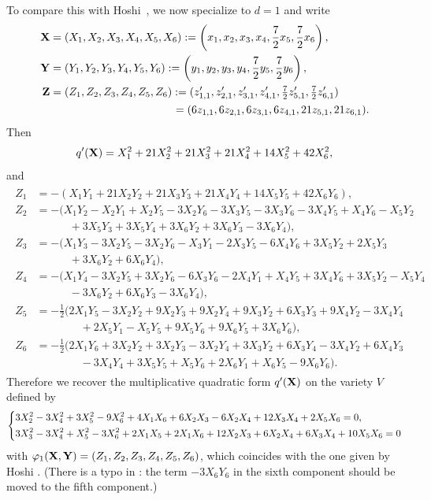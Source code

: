 \documentclass[a4paper, 11pt]{amsart}
\theoremstyle{plain}
\theoremstyle{definition}
\numberwithin{equation}{section}
\begin{document}
To compare this with Hoshi~\cite[Theorem 6]{Hos03}, we now specialize to $d=1$ and write
\begin{align*}
{\bf X}&=(X_1,X_2,X_3,X_4,X_5,X_6):=\left(x_1,x_2,x_3,x_4,\frac{7}{2}x_5,\frac{7}{2}x_6\right),\\
{\bf Y}&=(Y_1,Y_2,Y_3,Y_4,Y_5,Y_6):=\left(y_1,y_2,y_3,y_4,\frac{7}{2}y_5,\frac{7}{2}y_6\right),\\
{\bf Z}&=(Z_1,Z_2,Z_3,Z_4,Z_5,Z_6)
:=(z_{1,1}^{\prime},z_{2,1}^{\prime},z_{3,1}^{\prime},z_{4,1}^{\prime},\tfrac{7}{2}z_{5,1}^{\prime},\tfrac{7}{2}z_{6,1}^{\prime})\\
&\phantom{~=(Z_1,Z_2,Z_3,Z_4,Z_5,Z_6)}=(6z_{1,1},6z_{2,1},6z_{3,1},6z_{4,1},21z_{5,1},21z_{6,1}).
\end{align*}
Then
\[
q^\prime({\bf X})=X_1^2+21X_2^2+21X_3^2+21X_4^2+14X_5^2+42X_6^2,
\]
and
\begin{align*}
\begin{split}
Z_1
&=-(X_1Y_1+21X_2Y_2+21X_3Y_3+21X_4Y_4+14X_5Y_5+42X_6Y_6),\\
Z_2
&=-(X_1Y_2-X_2Y_1+X_2Y_5-3X_2Y_6-3X_3Y_5-3X_3Y_6-3X_4Y_5+X_4Y_6-X_5Y_2\\
&\qquad\quad +3X_5Y_3+3X_5Y_4+3X_6Y_2+3X_6Y_3-3X_6Y_4),\\
Z_3
&=-(X_1Y_3-3X_2Y_5-3X_2Y_6-X_3Y_1-2X_3Y_5-6X_4Y_6+3X_5Y_2+2X_5Y_3\\
&\qquad\quad +3X_6Y_2+6X_6Y_4),\\
Z_4
&=-(X_1Y_4-3X_2Y_5+3X_2Y_6-6X_3Y_6-2X_4Y_1+X_4Y_5+3X_4Y_6+3X_5Y_2-X_5Y_4\\
&\qquad\quad -3X_6Y_2+6X_6Y_3-3X_6Y_4),\\
Z_5
&=-\frac{1}{2}(2X_1Y_5-3X_2Y_2+9X_2Y_3+9X_2Y_4+9X_3Y_2+6X_3Y_3+9X_4Y_2-3X_4Y_4\\
&\qquad\qquad +2X_5Y_1-X_5Y_5+9X_5Y_6+9X_6Y_5+3X_6Y_6),\\
Z_6
&=-\frac{1}{2}(2X_1Y_6+3X_2Y_2+3X_2Y_3-3X_2Y_4+3X_3Y_2+6X_3Y_4-3X_4Y_2+6X_4Y_3\\
&\qquad\qquad -3X_4Y_4+3X_5Y_5+X_5Y_6+2X_6Y_1+X_6Y_5-9X_6Y_6).
\end{split}
\end{align*}
Therefore we recover the multiplicative quadratic form $q^\prime({\bf X})$ on the variety $V$
defined by
\begin{align*}
\begin{dcases}
3X_2^2-3X_4^2+3X_5^2-9X_6^2+4X_1X_6+6X_2X_3-6X_2X_4+12X_3X_4+2X_5X_6=0, \\
3X_3^2-3X_4^2+X_5^2-3X_6^2+2X_1X_5+2X_1X_6+12X_2X_3+6X_2X_4+6X_3X_4+10X_5X_6=0
\end{dcases}
\end{align*}
with $\varphi_1({\bf X},{\bf Y})=(Z_1,Z_2,Z_3,Z_4,Z_5,Z_6)$,
which coincides with the one given by Hoshi \cite[Section 2, Theorem~6]{Hos03}. (There is a typo in \cite[p.~74, line 18]{Hos03}: the term $-3X_6Y_6$ in the sixth component should be moved to the fifth component.)
\end{document}
